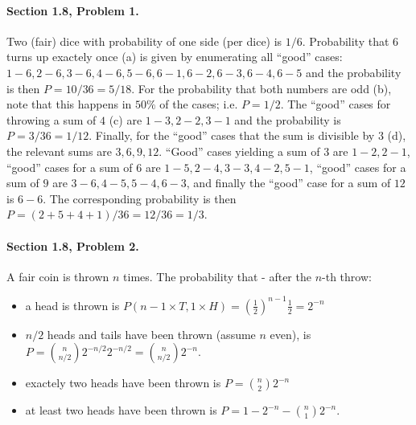 \paragraph{Section 1.8, Problem 1.} Two (fair) dice with probability of one side (per dice) is $1/6$. Probability that $6$ turns up exactely once (a) is given by enumerating all ``good'' cases: $1-6, 2-6, 3-6, 4-6, 5-6, 6-1, 6-2, 6-3, 6-4, 6-5$ and the probability is then $P = 10/36 = 5/18$. For the probability that both numbers are odd (b), note that this happens in $50\%$ of the cases; i.e. $P = 1/2$. The ``good'' cases for throwing a sum of $4$ (c) are $1-3, 2-2, 3-1$ and the probability is $P = 3/36 = 1/12$. Finally, for the ``good'' cases that the sum is divisible by $3$ (d), the relevant sums are $3,6,9,12$. ``Good'' cases yielding a sum of $3$ are $1-2, 2-1$, ``good'' cases for a sum of $6$ are $1-5, 2-4, 3-3, 4-2, 5-1$, ``good'' cases for a sum of $9$ are $3-6, 4-5, 5-4, 6-3$, and finally the ``good'' case for a sum of $12$ is $6-6$. The corresponding probability is then $P = (2 + 5 + 4 + 1)/36 = 12/36 = 1/3$.

\paragraph{Section 1.8, Problem 2.} A fair coin is thrown $n$ times. The probability that - after the $n$-th throw:

\begin{itemize}

\item a head is thrown is $P( n-1 \times T, 1 \times H) = \left(\frac{1}{2}\right)^{n-1} \frac{1}{2} = 2^{-n}$

\item $n/2$ heads and tails have been thrown (assume $n$ even), is $P = {n \choose n/2} 2^{-n/2} 2^{-n/2} = {n \choose n/2}2^{-n}$.

\item exactely two heads have been thrown is $P = {n \choose 2} 2^{-n}$

\item at least two heads have been thrown is $P = 1 - 2^{-n} - {n \choose 1} 2^{-n}$.  
  
\end{itemize}


